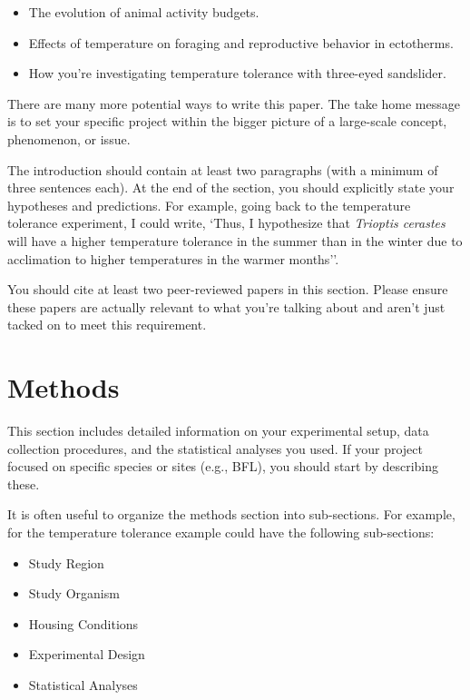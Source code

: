 \documentclass[]{book}
\providecommand{\tightlist}{%
  \setlength{\itemsep}{0pt}\setlength{\parskip}{0pt}}
\begin{document}
\begin{itemize}
\tightlist
\item
  The evolution of animal activity budgets.
\item
  Effects of temperature on foraging and reproductive behavior in
  ectotherms.
\item
  How you're investigating temperature tolerance with three-eyed
  sandslider.
\end{itemize}

There are many more potential ways to write this paper. The take home
message is to set your specific project within the bigger picture of a
large-scale concept, phenomenon, or issue.

The introduction should contain at least two paragraphs (with a minimum
of three sentences each). At the end of the section, you should
explicitly state your hypotheses and predictions. For example, going
back to the temperature tolerance experiment, I could write, `Thus, I
hypothesize that \emph{Trioptis cerastes} will have a higher temperature
tolerance in the summer than in the winter due to acclimation to higher
temperatures in the warmer months''.

You should cite at least two peer-reviewed papers in this section.
Please ensure these papers are actually relevant to what you're talking
about and aren't just tacked on to meet this requirement.

\section{Methods}\label{methods}

This section includes detailed information on your experimental setup,
data collection procedures, and the statistical analyses you used. If
your project focused on specific species or sites (e.g., BFL), you
should start by describing these.

It is often useful to organize the methods section into sub-sections.
For example, for the temperature tolerance example could have the
following sub-sections:

\begin{itemize}
\tightlist
\item
  Study Region
\item
  Study Organism
\item
  Housing Conditions
\item
  Experimental Design
\item
  Statistical Analyses
\end{itemize}
\end{document}

